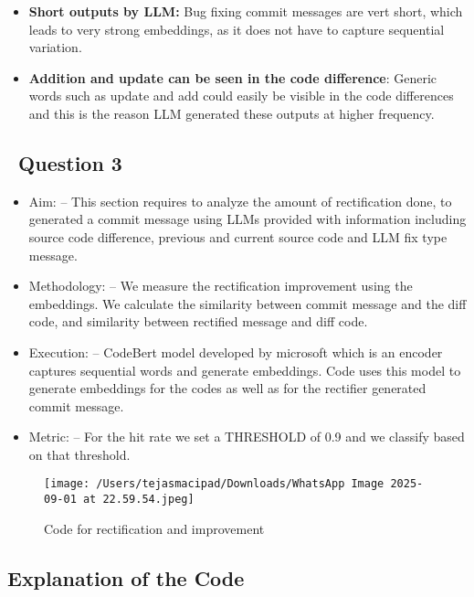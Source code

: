 \documentclass[12pt,a4paper]{article}
\begin{document}
\begin{itemize}
    \item \textbf{Short outputs by LLM:} Bug fixing commit messages are vert short, which leads to very strong embeddings, as it does not have to capture sequential variation.
    \item \textbf{Addition and update can be seen in the code difference}: Generic words such as update and add could easily be visible in the code differences and this is the reason LLM generated these outputs at higher frequency.
\end{itemize}

\newpage

\subsection*{\   Question 3}

\begin{itemize}
    \item {Aim:} -- This section requires to analyze the amount of rectification done, to generated a commit message using LLMs provided with information including source code difference, previous and current source code and LLM fix type message.
    \item {Methodology:} -- We measure the rectification improvement using the embeddings. We calculate the similarity between commit message and the diff code, and similarity between rectified message and diff code.
    \item {Execution:} -- CodeBert model developed by microsoft which is an encoder captures sequential words and generate embeddings. Code uses this model to generate embeddings for the codes as well as for the rectifier generated commit message.
    \item {Metric: } -- For the hit rate we set a THRESHOLD of 0.9 and we classify based on that threshold.
\end{itemize}

\begin{figure}[h!]
    \centering
    \texttt{[image: /Users/tejasmacipad/Downloads/WhatsApp Image 2025-09-01 at 22.59.54.jpeg]}
    \caption{Code for rectification and improvement}
\end{figure}

\subsection*{Explanation of the Code}
\end{document}
